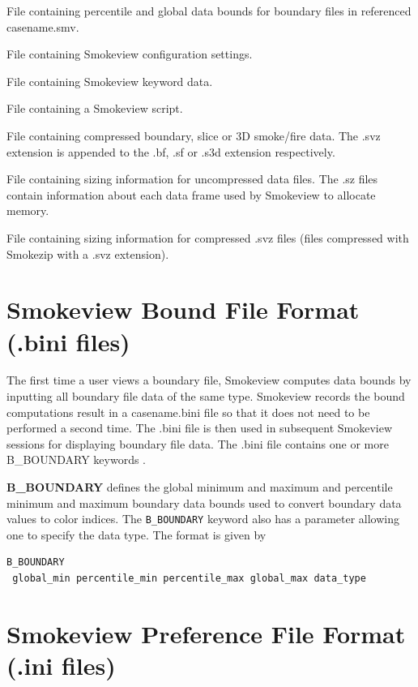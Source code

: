\documentclass[11pt,twoside]{book}
\newcommand{\parma}{.75}
\newcommand{\parmb}{.5}
\newcommand{\parmc}{0.25}
\newcommand{\blist}{
\begin{list}
{}{
\setlength{\leftmargin}{\parma in}
\setlength{\labelwidth}{\parmb in}
\setlength{\labelsep}{\parmc in}
\setlength{\listparindent}{0.3in}
\setlength{\topsep}{.3in}
\setlength{\parsep}{.0in}
}}
\newcommand{\elist}{\end{list}}
\newcommand{\hitem}[1]{\item[{\bf #1} \hfill]}
\begin{document}
\blist

\hitem{.bini} File containing percentile and global data bounds for boundary files in referenced casename.smv.

\hitem{.ini} File containing Smokeview configuration settings.

\hitem{.smv} File containing Smokeview keyword data.

\hitem{.ssf} File containing a Smokeview script.

\hitem{.svz} File containing compressed boundary, slice or 3D smoke/fire data.  The .svz extension is appended to the .bf, .sf or .s3d extension respectively.

\hitem{.sz} File containing sizing information for uncompressed data files.  The .sz files contain information about each data frame used by Smokeview to allocate memory.

\hitem{.szz} File containing sizing information for compressed .svz files (files compressed with Smokezip with a .svz extension).

\elist

\section{Smokeview Bound File Format (.bini files)}
The first time a user views a boundary file, Smokeview computes data bounds by inputting
all boundary file data of the same type.
Smokeview records the bound computations result in a casename.bini file
so that it does not need to be performed a second time.  The .bini file is then used in subsequent Smokeview sessions for displaying boundary file data.  The .bini file contains one or more B\_BOUNDARY keywords .

{\bf B\_BOUNDARY} defines the global minimum and maximum and percentile minimum and
maximum boundary
data bounds used to convert boundary data values to color indices.
The {\tt B\_BOUNDARY} keyword also has a parameter allowing
one to specify the data type.  The format is given by
\begin{lstlisting}
B_BOUNDARY
 global_min percentile_min percentile_max global_max data_type
\end{lstlisting}



\section{Smokeview Preference File Format (.ini files)}
\label{sectionconfig}
\label{appendixini}
\end{document}
